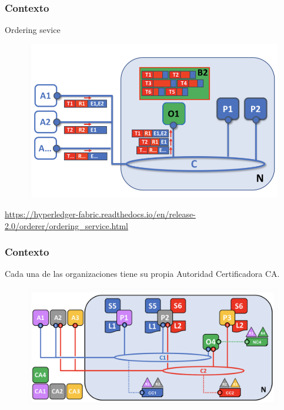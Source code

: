 \documentclass{beamer}
\begin{document}
	\begin{frame}
		\frametitle{Contexto}
		Ordering sevice
		\begin{figure}[h]
			\includegraphics[scale=.5]{start_02}
			\centering
		\end{figure}
		\begin{center}
			\tiny{\url{https://hyperledger-fabric.readthedocs.io/en/release-2.0/orderer/ordering_service.html}}
		\end{center}
	\end{frame}

	\begin{frame}
		\frametitle{Contexto}
		Cada una de las organizaciones tiene su propia Autoridad Certificadora CA.
		\begin{figure}[h]
			\includegraphics[scale=.3]{start_01}
			\centering
		\end{figure}
	\end{frame}
	
\end{document}
